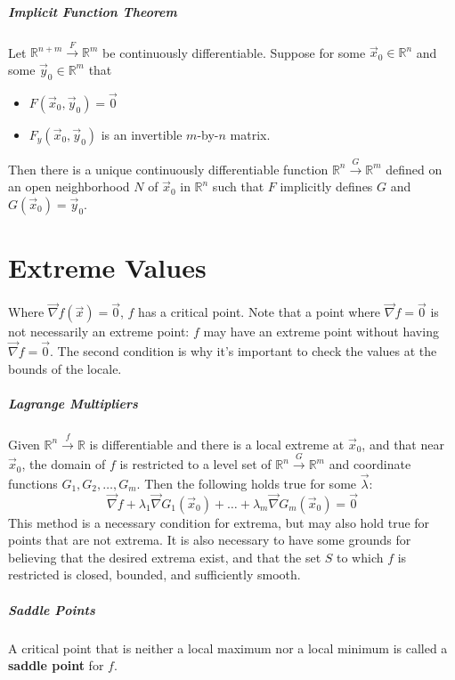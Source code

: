 \documentclass[11pt]{article}
\begin{document}
	\subparagraph{Implicit Function Theorem} Let $\mathbb{R}^{n+m} \xrightarrow{F} \mathbb{R}^m$ be continuously differentiable. Suppose for some $\vec{x}_0 \in \mathbb{R}^n$ and some $\vec{y}_0 \in \mathbb{R}^m$ that
	\begin{itemize}
		\item $F(\vec{x}_0, \vec{y}_0) = \vec{0}$
		\item $F_y(\vec{x}_0, \vec{y}_0)$ is an invertible $m$-by-$n$ matrix.
	\end{itemize}
	Then there is a unique continuously differentiable function $\mathbb{R}^n \xrightarrow{G} \mathbb{R}^m$ defined on an open neighborhood $N$ of $\vec{x}_0$ in $\mathbb{R}^n$ such that $F$ implicitly defines $G$ and $G(\vec{x}_0) = \vec{y}_0$.

\section{Extreme Values}
	Where $\vec{\nabla} f(\vec{x}) = \vec{0}$, $f$ has a critical point. Note that a point where $\vec{\nabla} f = \vec{0}$ is not necessarily an extreme point: $f$ may have an extreme point without having $\vec{\nabla} f = \vec{0}$. The second condition is why it's important to check the values at the bounds of the locale.
	
	\subparagraph{Lagrange Multipliers} Given $\mathbb{R}^n \xrightarrow{f} \mathbb{R}$ is differentiable and there is a local extreme at $\vec{x}_0$, and that near $\vec{x}_0$, the domain of $f$ is restricted to a level set of $\mathbb{R}^n \xrightarrow{G} \mathbb{R}^m$ and coordinate functions $G_1, G_2, \ldots , G_m$. Then the following holds true for some $\vec{\lambda}$:
	\begin{equation}
		\vec{\nabla} f + \lambda_1 \vec{\nabla} G_1(\vec{x}_0) + \ldots + \lambda_m \vec{\nabla} G_m(\vec{x}_0) = \vec{0}
	\end{equation}
	This method is a necessary condition for extrema, but may also hold true for points that are not extrema. It is also necessary to have some grounds for believing that the desired extrema exist, and that the set $S$ to which $f$ is restricted is closed, bounded, and sufficiently smooth.
	
	\subparagraph{Saddle Points} A critical point that is neither a local maximum nor a local minimum is called a \textbf{saddle point} for $f$.
	
\end{document}
